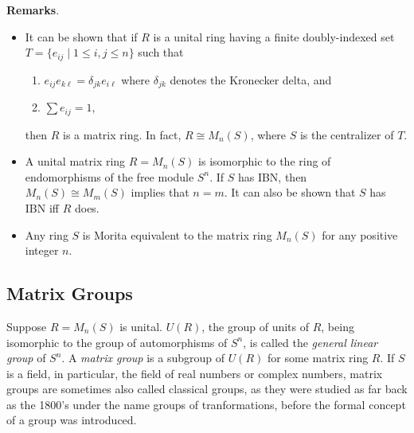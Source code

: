 \documentclass[12pt]{article}
\begin{document}
\textbf{Remarks}.  
\begin{itemize}
\item It can be shown that if $R$ is a unital ring having a finite doubly-indexed set $T=\lbrace e_{ij} \mid 1\le i,j\le n\rbrace$ such that 
\begin{enumerate}
\item $e_{ij}e_{k\ell}=\delta_{jk}e_{i\ell}$ where $\delta_{jk}$ denotes the Kronecker delta, and 
\item $\sum e_{ij}=1$,
\end{enumerate} 
then $R$ is a matrix ring.  In fact, $R\cong M_n(S)$, where $S$ is the centralizer of $T$.
\item A unital matrix ring $R=M_n(S)$ is isomorphic to the ring of endomorphisms of the free module $S^n$.  If $S$ has IBN, then $M_n(S)\cong M_m(S)$ implies that $n=m$.  It can also be shown that $S$ has IBN iff $R$ does.
\item Any ring $S$ is Morita equivalent to the matrix ring $M_n(S)$ for any positive integer $n$.
\end{itemize}
\subsection{Matrix Groups}
Suppose $R=M_n(S)$ is unital.  $U(R)$, the group of units of $R$, being isomorphic to the group of automorphisms of $S^n$, is called the \emph{general linear group} of $S^n$.  A \emph{matrix group} is a subgroup of $U(R)$ for some matrix ring $R$.  If $S$ is a field, in particular, the field of real numbers or complex numbers, matrix groups are sometimes also called classical groups, as they were studied as far back as the 1800's under the name groups of tranformations, before the formal concept of a group was introduced.
\end{document}
